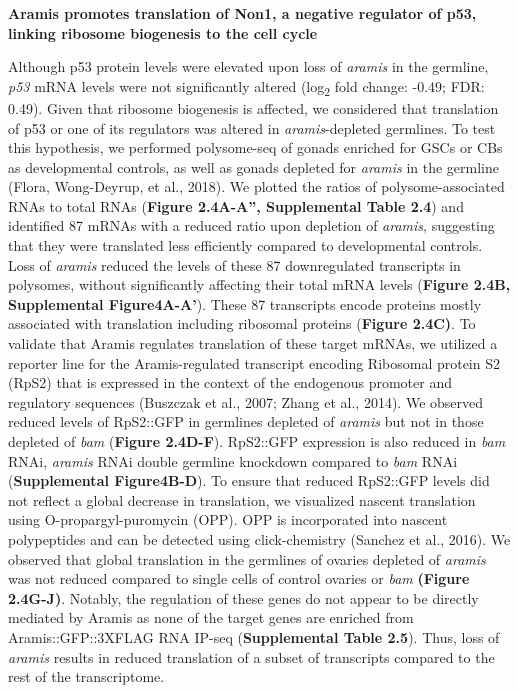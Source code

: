 \documentclass[12pt,twoside]{reedthesis}
\begin{document}
\textbf{Aramis promotes translation of Non1, a negative regulator of p53,
linking ribosome biogenesis to the cell cycle}

Although p53 protein levels were elevated upon loss of \emph{aramis} in the
germline, \emph{p53} mRNA levels were not significantly altered (log\textsubscript{2} fold
change: -0.49; FDR: 0.49). Given that ribosome biogenesis is affected,
we considered that translation of p53 or one of its regulators was
altered in \emph{aramis}-depleted germlines. To test this hypothesis, we
performed polysome-seq of gonads enriched for GSCs or CBs as
developmental controls, as well as gonads depleted for \emph{aramis} in the
germline (Flora, Wong-Deyrup, et al., 2018). We plotted the ratios of polysome-associated
RNAs to total RNAs (\textbf{Figure 2.4A-A'', Supplemental Table 2.4}) and
identified 87 mRNAs with a reduced ratio upon depletion of \emph{aramis},
suggesting that they were translated less efficiently compared to
developmental controls. Loss of \emph{aramis} reduced the levels of these 87
downregulated transcripts in polysomes, without significantly affecting
their total mRNA levels (\textbf{Figure 2.4B, Supplemental Figure4A-A'}). These 87
transcripts encode proteins mostly associated with translation including
ribosomal proteins (\textbf{Figure 2.4C)}. To validate that Aramis regulates
translation of these target mRNAs, we utilized a reporter line for the
Aramis-regulated transcript encoding Ribosomal protein S2 (RpS2) that is
expressed in the context of the endogenous promoter and regulatory
sequences (Buszczak et al., 2007; Zhang et al., 2014). We
observed reduced levels of RpS2::GFP in germlines depleted of \emph{aramis}
but not in those depleted of \emph{bam} (\textbf{Figure 2.4D-F}). RpS2::GFP
expression is also reduced in \emph{bam} RNAi, \emph{aramis} RNAi double germline
knockdown compared to \emph{bam} RNAi (\textbf{Supplemental Figure4B-D}). To ensure that
reduced RpS2::GFP levels did not reflect a global decrease in
translation, we visualized nascent translation using
O-propargyl-puromycin (OPP). OPP is incorporated into nascent
polypeptides and can be detected using click-chemistry
(Sanchez et al., 2016). We observed that global translation in the germlines
of ovaries depleted of \emph{aramis} was not reduced compared to single cells
of control ovaries or \emph{bam} \textbf{(Figure 2.4G-J)}. Notably, the regulation
of these genes do not appear to be directly mediated by Aramis as none
of the target genes are enriched from Aramis::GFP::3XFLAG RNA IP-seq
(\textbf{Supplemental Table 2.5}). Thus, loss of \emph{aramis} results in reduced
translation of a subset of transcripts compared to the rest of the
transcriptome.
\end{document}
